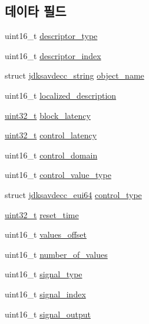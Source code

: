 \subsection*{데이타 필드}
\begin{DoxyCompactItemize}
\item 
uint16\+\_\+t \hyperlink{structjdksavdecc__descriptor__control_ab7c32b6c7131c13d4ea3b7ee2f09b78d}{descriptor\+\_\+type}
\item 
uint16\+\_\+t \hyperlink{structjdksavdecc__descriptor__control_a042bbc76d835b82d27c1932431ee38d4}{descriptor\+\_\+index}
\item 
struct \hyperlink{structjdksavdecc__string}{jdksavdecc\+\_\+string} \hyperlink{structjdksavdecc__descriptor__control_a7d1f5945a13863b1762fc6db74fa8f80}{object\+\_\+name}
\item 
uint16\+\_\+t \hyperlink{structjdksavdecc__descriptor__control_a0926f846ca65a83ad5bb06b4aff8f408}{localized\+\_\+description}
\item 
\hyperlink{parse_8c_a6eb1e68cc391dd753bc8ce896dbb8315}{uint32\+\_\+t} \hyperlink{structjdksavdecc__descriptor__control_ae2e9f0088d5e900b610d1b2818dfc559}{block\+\_\+latency}
\item 
\hyperlink{parse_8c_a6eb1e68cc391dd753bc8ce896dbb8315}{uint32\+\_\+t} \hyperlink{structjdksavdecc__descriptor__control_ab2bd4639caaf9a8078b68368afbd63b6}{control\+\_\+latency}
\item 
uint16\+\_\+t \hyperlink{structjdksavdecc__descriptor__control_a8937b22996b7c28ae209f29fe777f03a}{control\+\_\+domain}
\item 
uint16\+\_\+t \hyperlink{structjdksavdecc__descriptor__control_a62a5b88a920cc4d09508de6fc60d9a63}{control\+\_\+value\+\_\+type}
\item 
struct \hyperlink{structjdksavdecc__eui64}{jdksavdecc\+\_\+eui64} \hyperlink{structjdksavdecc__descriptor__control_affec595f0ec2a4ae7a3cece71d05adcb}{control\+\_\+type}
\item 
\hyperlink{parse_8c_a6eb1e68cc391dd753bc8ce896dbb8315}{uint32\+\_\+t} \hyperlink{structjdksavdecc__descriptor__control_a8fb66f63094794fbbdacc69af5cc55fa}{reset\+\_\+time}
\item 
uint16\+\_\+t \hyperlink{structjdksavdecc__descriptor__control_a2987071ee0b81f35817e48a0dc92ad76}{values\+\_\+offset}
\item 
uint16\+\_\+t \hyperlink{structjdksavdecc__descriptor__control_a1c32421ead62b8a032c4346688cd9b69}{number\+\_\+of\+\_\+values}
\item 
uint16\+\_\+t \hyperlink{structjdksavdecc__descriptor__control_a248e60ef99d5ed1779989d1dd6b6dc5a}{signal\+\_\+type}
\item 
uint16\+\_\+t \hyperlink{structjdksavdecc__descriptor__control_ae2e81a95ee9ad83f1fe22b6a1ee29075}{signal\+\_\+index}
\item 
uint16\+\_\+t \hyperlink{structjdksavdecc__descriptor__control_ab4b91864e6fc335d7e86536d9f4461e4}{signal\+\_\+output}
\end{DoxyCompactItemize}


